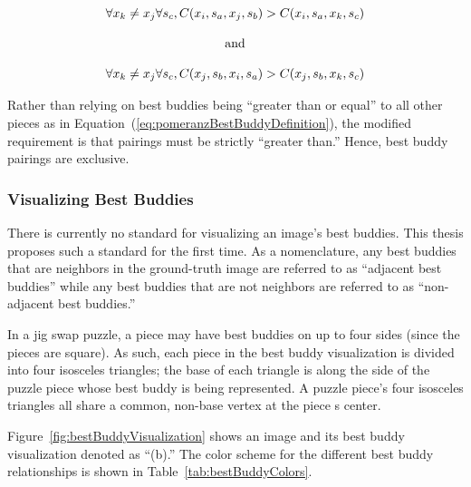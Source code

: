 \documentclass{report}
\def\eref#1{(\ref{#1})}
\begin{document}
\begin{equation} \label{eq:hammoudehBestBuddyDefinition}
\centering
\begin{split}
	\begin{matrix}
		\forall{x_{k} \ne x_{j}}\forall{s_c},C(x_i, s_a, x_j, s_b) > C(x_i, s_a, x_k, s_c)
		\\
		\\
		\textnormal{and}
		\\
		\\
		\forall{x_{k} \ne x_{j}}\forall{s_c},C(x_j, s_b, x_i, s_a) > C(x_j, s_b, x_k, s_c)
	\end{matrix}
\end{split}
\end{equation}

Rather than relying on best buddies being ``greater than or equal'' to all other pieces as in Equation~\eref{eq:pomeranzBestBuddyDefinition}, the modified requirement is that pairings must be strictly ``greater than.''  Hence, best buddy pairings are exclusive.

\subsubsection{Visualizing Best Buddies}\label{sec:visualizingBestBuddies}

There is currently no standard for visualizing an image's best buddies.  This thesis proposes such a standard for the first time.  As a nomenclature, any best buddies that are neighbors in the ground-truth image are referred to as ``adjacent best buddies'' while any best buddies that are not neighbors are referred to as ``non-adjacent best buddies.''

In a jig swap puzzle, a piece may have best buddies on up to four sides (since the pieces are square).  As such, each piece in the best buddy visualization is divided into four isosceles triangles; the base of each triangle is along the side of the puzzle piece whose best buddy is being represented.  A puzzle piece's four isosceles triangles all share a common, non-base vertex at the piece
s center.  

Figure~\ref{fig:bestBuddyVisualization} shows an image and its best buddy visualization denoted as ``(b).'' The color scheme for the different best buddy relationships is shown in Table~\ref{tab:bestBuddyColors}.
\end{document}
